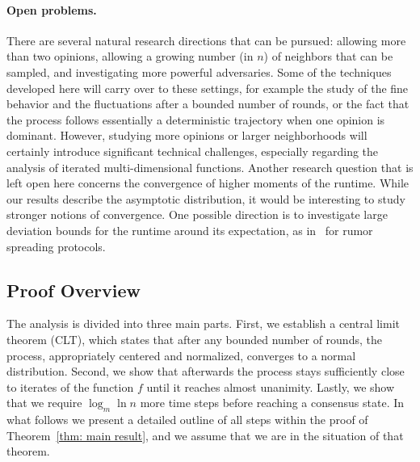 \documentclass[11pt]{article}
\numberwithin{theorem}{section}
\begin{document}
\paragraph{Open problems.} 
There are several natural research directions that can be pursued: allowing more than two opinions, allowing a growing number (in $n$) of neighbors that can be sampled, and investigating more powerful adversaries. Some of the techniques developed here will carry over to these settings, for example the study of the fine behavior and the fluctuations after a bounded number of rounds, or the fact that the process follows essentially a deterministic trajectory when one opinion is dominant. However, studying more opinions or larger neighborhoods will certainly introduce significant technical challenges, especially regarding the analysis of iterated multi-dimensional functions. 
Another research question that is left open here concerns the convergence of higher moments of the runtime. While our results describe the asymptotic distribution, it would be interesting to study stronger notions of convergence. One possible direction is to investigate large deviation bounds for the runtime around its expectation, as in~\cite{doerr_et_al:LIPIcs.ICALP.2017.138} for rumor spreading protocols.  





\subsection{Proof Overview}\label{sec: proof overview}

The analysis is divided into three main parts. First, we establish a central limit theorem (CLT), which states that after any bounded number of rounds, the process, appropriately centered and normalized, converges to a normal distribution. Second, we show that afterwards the process stays sufficiently close to iterates of the function $f$ until it reaches almost unanimity.
Lastly, we show that we require $\log_m\ln n$ more time steps before reaching a consensus state. In what follows we present a detailed outline of all steps within  the proof of Theorem~\ref{thm: main result}, and we assume that we are in the situation of that theorem.
\end{document}
